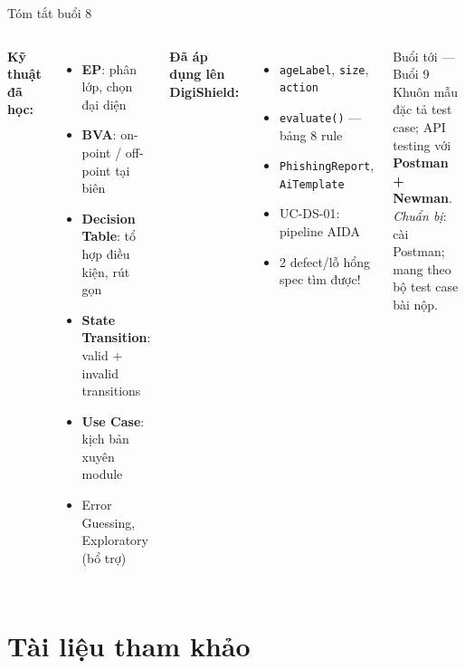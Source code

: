 \documentclass[aspectratio=169,12pt]{beamer}
\begin{document}
\begin{frame}{Tóm tắt buổi 8}
  \begin{columns}[T]
    \textbf{Kỹ thuật đã học:}
    \begin{itemize}
      \item \textbf{EP}: phân lớp, chọn đại diện
      \item \textbf{BVA}: on-point / off-point tại biên
      \item \textbf{Decision Table}: tổ hợp điều kiện, rút gọn
      \item \textbf{State Transition}: valid + invalid transitions
      \item \textbf{Use Case}: kịch bản xuyên module
      \item Error Guessing, Exploratory (bổ trợ)
    \end{itemize}

    \textbf{Đã áp dụng lên DigiShield:}
    \begin{itemize}
      \item \texttt{ageLabel}, \texttt{size}, \texttt{action}
      \item \texttt{evaluate()} --- bảng 8 rule
      \item \texttt{PhishingReport}, \texttt{AiTemplate}
      \item UC-DS-01: pipeline AIDA
      \item 2 defect/lỗ hổng spec tìm được!
    \end{itemize}

    \vspace{0.2em}
    \begin{block}{Buổi tới --- Buổi 9}
      Khuôn mẫu đặc tả test case; API testing với
      \textbf{Postman + Newman}.\\
      \textit{Chuẩn bị}: cài Postman; mang theo bộ test case bài nộp.
    \end{block}
  \end{columns}
\end{frame}

\section{Tài liệu tham khảo}
\end{document}
